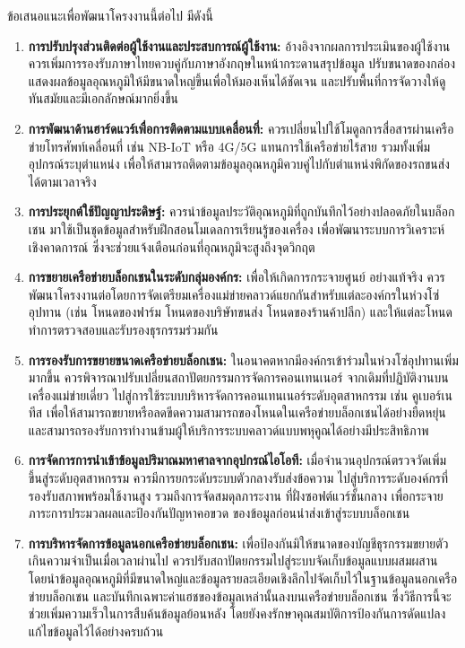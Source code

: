 ข้อเสนอแนะเพื่อพัฒนาโครงงานนี้ต่อไป มีดังนี้

\begin{enumerate}
    \item \textbf{การปรับปรุงส่วนติดต่อผู้ใช้งานและประสบการณ์ผู้ใช้งาน:} อ้างอิงจากผลการประเมินของผู้ใช้งาน ควรเพิ่มการรองรับภาษาไทยควบคู่กับภาษาอังกฤษในหน้ากระดานสรุปข้อมูล ปรับขนาดของกล่องแสดงผลข้อมูลอุณหภูมิให้มีขนาดใหญ่ขึ้นเพื่อให้มองเห็นได้ชัดเจน และปรับพื้นที่การจัดวางให้ดูทันสมัยและมีเอกลักษณ์มากยิ่งขึ้น
    \item \textbf{การพัฒนาด้านฮาร์ดแวร์เพื่อการติดตามแบบเคลื่อนที่:} ควรเปลี่ยนไปใช้โมดูลการสื่อสารผ่านเครือข่ายโทรศัพท์เคลื่อนที่ เช่น NB-IoT หรือ 4G/5G แทนการใช้เครือข่ายไร้สาย รวมทั้งเพิ่มอุปกรณ์ระบุตำแหน่ง เพื่อให้สามารถติดตามข้อมูลอุณหภูมิควบคู่ไปกับตำแหน่งพิกัดของรถขนส่งได้ตามเวลาจริง
    \item \textbf{การประยุกต์ใช้ปัญญาประดิษฐ์:} ควรนำข้อมูลประวัติอุณหภูมิที่ถูกบันทึกไว้อย่างปลอดภัยในบล็อกเชน มาใช้เป็นชุดข้อมูลสำหรับฝึกสอนโมเดลการเรียนรู้ของเครื่อง เพื่อพัฒนาระบบการวิเคราะห์เชิงคาดการณ์ ซึ่งจะช่วยแจ้งเตือนก่อนที่อุณหภูมิจะสูงถึงจุดวิกฤต
    \item \textbf{การขยายเครือข่ายบล็อกเชนในระดับกลุ่มองค์กร:} เพื่อให้เกิดการกระจายศูนย์ อย่างแท้จริง ควรพัฒนาโครงงานต่อโดยการจัดเตรียมเครื่องแม่ข่ายคลาวด์แยกกันสำหรับแต่ละองค์กรในห่วงโซ่อุปทาน (เช่น โหนดของฟาร์ม โหนดของบริษัทขนส่ง โหนดของร้านค้าปลีก) และให้แต่ละโหนดทำการตรวจสอบและรับรองธุรกรรมร่วมกัน
    \item \textbf{การรองรับการขยายขนาดเครือข่ายบล็อกเชน:} ในอนาคตหากมีองค์กรเข้าร่วมในห่วงโซ่อุปทานเพิ่มมากขึ้น ควรพิจารณาปรับเปลี่ยนสถาปัตยกรรมการจัดการคอนเทนเนอร์ จากเดิมที่ปฏิบัติงานบนเครื่องแม่ข่ายเดี่ยว ไปสู่การใช้ระบบบริหารจัดการคอนเทนเนอร์ระดับอุตสาหกรรม เช่น คูเบอร์เนทีส เพื่อให้สามารถขยายหรือลดขีดความสามารถของโหนดในเครือข่ายบล็อกเชนได้อย่างยืดหยุ่น และสามารถรองรับการทำงานข้ามผู้ให้บริการระบบคลาวด์แบบพหุคูณได้อย่างมีประสิทธิภาพ
    \item \textbf{การจัดการการนำเข้าข้อมูลปริมาณมหาศาลจากอุปกรณ์ไอโอที:} เมื่อจำนวนอุปกรณ์ตรวจวัดเพิ่มขึ้นสู่ระดับอุตสาหกรรม ควรมีการยกระดับระบบตัวกลางรับส่งข้อความ ไปสู่บริการระดับองค์กรที่รองรับสภาพพร้อมใช้งานสูง รวมถึงการจัดสมดุลภาระงาน ที่ฝั่งซอฟต์แวร์ชั้นกลาง เพื่อกระจายภาระการประมวลผลและป้องกันปัญหาคอขวด ของข้อมูลก่อนนำส่งเข้าสู่ระบบบล็อกเชน
    \item \textbf{การบริหารจัดการข้อมูลนอกเครือข่ายบล็อกเชน:} เพื่อป้องกันมิให้ขนาดของบัญชีธุรกรรมขยายตัวเกินความจำเป็นเมื่อเวลาผ่านไป ควรปรับสถาปัตยกรรมไปสู่ระบบจัดเก็บข้อมูลแบบผสมผสาน โดยนำข้อมูลอุณหภูมิที่มีขนาดใหญ่และข้อมูลรายละเอียดเชิงลึกไปจัดเก็บไว้ในฐานข้อมูลนอกเครือข่ายบล็อกเชน และบันทึกเฉพาะค่าแฮชของข้อมูลเหล่านั้นลงบนเครือข่ายบล็อกเชน ซึ่งวิธีการนี้จะช่วยเพิ่มความเร็วในการสืบค้นข้อมูลย้อนหลัง โดยยังคงรักษาคุณสมบัติการป้องกันการดัดแปลงแก้ไขข้อมูลไว้ได้อย่างครบถ้วน
\end{enumerate}